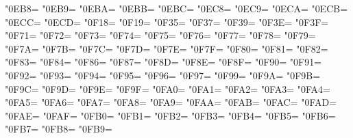 \XeTeXcharclass"0EB8=\KclassCM
\XeTeXcharclass"0EB9=\KclassCM
\XeTeXcharclass"0EBA=\KclassCM
\XeTeXcharclass"0EBB=\KclassCM
\XeTeXcharclass"0EBC=\KclassCM
\XeTeXcharclass"0EC8=\KclassCM
\XeTeXcharclass"0EC9=\KclassCM
\XeTeXcharclass"0ECA=\KclassCM
\XeTeXcharclass"0ECB=\KclassCM
\XeTeXcharclass"0ECC=\KclassCM
\XeTeXcharclass"0ECD=\KclassCM
\XeTeXcharclass"0F18=\KclassCM
\XeTeXcharclass"0F19=\KclassCM
\XeTeXcharclass"0F35=\KclassCM
\XeTeXcharclass"0F37=\KclassCM
\XeTeXcharclass"0F39=\KclassCM
\XeTeXcharclass"0F3E=\KclassCM
\XeTeXcharclass"0F3F=\KclassCM
\XeTeXcharclass"0F71=\KclassCM
\XeTeXcharclass"0F72=\KclassCM
\XeTeXcharclass"0F73=\KclassCM
\XeTeXcharclass"0F74=\KclassCM
\XeTeXcharclass"0F75=\KclassCM
\XeTeXcharclass"0F76=\KclassCM
\XeTeXcharclass"0F77=\KclassCM
\XeTeXcharclass"0F78=\KclassCM
\XeTeXcharclass"0F79=\KclassCM
\XeTeXcharclass"0F7A=\KclassCM
\XeTeXcharclass"0F7B=\KclassCM
\XeTeXcharclass"0F7C=\KclassCM
\XeTeXcharclass"0F7D=\KclassCM
\XeTeXcharclass"0F7E=\KclassCM
\XeTeXcharclass"0F7F=\KclassCM
\XeTeXcharclass"0F80=\KclassCM
\XeTeXcharclass"0F81=\KclassCM
\XeTeXcharclass"0F82=\KclassCM
\XeTeXcharclass"0F83=\KclassCM
\XeTeXcharclass"0F84=\KclassCM
\XeTeXcharclass"0F86=\KclassCM
\XeTeXcharclass"0F87=\KclassCM
\XeTeXcharclass"0F8D=\KclassCM
\XeTeXcharclass"0F8E=\KclassCM
\XeTeXcharclass"0F8F=\KclassCM
\XeTeXcharclass"0F90=\KclassCM
\XeTeXcharclass"0F91=\KclassCM
\XeTeXcharclass"0F92=\KclassCM
\XeTeXcharclass"0F93=\KclassCM
\XeTeXcharclass"0F94=\KclassCM
\XeTeXcharclass"0F95=\KclassCM
\XeTeXcharclass"0F96=\KclassCM
\XeTeXcharclass"0F97=\KclassCM
\XeTeXcharclass"0F99=\KclassCM
\XeTeXcharclass"0F9A=\KclassCM
\XeTeXcharclass"0F9B=\KclassCM
\XeTeXcharclass"0F9C=\KclassCM
\XeTeXcharclass"0F9D=\KclassCM
\XeTeXcharclass"0F9E=\KclassCM
\XeTeXcharclass"0F9F=\KclassCM
\XeTeXcharclass"0FA0=\KclassCM
\XeTeXcharclass"0FA1=\KclassCM
\XeTeXcharclass"0FA2=\KclassCM
\XeTeXcharclass"0FA3=\KclassCM
\XeTeXcharclass"0FA4=\KclassCM
\XeTeXcharclass"0FA5=\KclassCM
\XeTeXcharclass"0FA6=\KclassCM
\XeTeXcharclass"0FA7=\KclassCM
\XeTeXcharclass"0FA8=\KclassCM
\XeTeXcharclass"0FA9=\KclassCM
\XeTeXcharclass"0FAA=\KclassCM
\XeTeXcharclass"0FAB=\KclassCM
\XeTeXcharclass"0FAC=\KclassCM
\XeTeXcharclass"0FAD=\KclassCM
\XeTeXcharclass"0FAE=\KclassCM
\XeTeXcharclass"0FAF=\KclassCM
\XeTeXcharclass"0FB0=\KclassCM
\XeTeXcharclass"0FB1=\KclassCM
\XeTeXcharclass"0FB2=\KclassCM
\XeTeXcharclass"0FB3=\KclassCM
\XeTeXcharclass"0FB4=\KclassCM
\XeTeXcharclass"0FB5=\KclassCM
\XeTeXcharclass"0FB6=\KclassCM
\XeTeXcharclass"0FB7=\KclassCM
\XeTeXcharclass"0FB8=\KclassCM
\XeTeXcharclass"0FB9=\KclassCM
